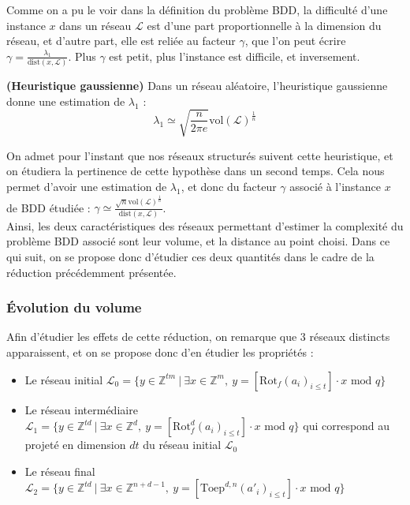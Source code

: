 \documentclass[11pt,a4paper]{article}
\begin{document}
Comme on a pu le voir dans la définition du problème BDD, la difficulté d'une instance $x$ dans un réseau $\mathcal{L}$ est d'une part proportionnelle à la dimension du réseau, et d'autre part, elle est reliée au facteur $\gamma$, que l'on peut écrire $\gamma = \frac{\lambda_1}{\text{dist}(x,\mathcal{L})}$. Plus $\gamma$ est petit, plus l'instance est difficile, et inversement. \\


\begin{rem}\textbf{(Heuristique gaussienne)}
Dans un réseau aléatoire, l'heuristique gaussienne donne une estimation de $\lambda_1$ :  \[\lambda_1 \simeq \sqrt{\frac{n}{2\pi e}}\text{vol}(\mathcal{L})^\frac{1}{n} \]
\end{rem}

On admet pour l'instant que nos réseaux structurés suivent cette heuristique, et on étudiera la pertinence de cette hypothèse dans un second temps. Cela nous permet d'avoir une estimation de $\lambda_1$, et donc du facteur $\gamma$ associé à l'instance $x$ de BDD étudiée : $\gamma \simeq \frac{\sqrt{n}\text{vol}(\mathcal{L})^\frac{1}{n}}{\text{dist}(x,\mathcal{L})}$. \\

Ainsi, les deux caractéristiques des réseaux permettant d'estimer la complexité du problème BDD associé sont leur volume, et la distance au point choisi.  Dans ce qui suit, on se propose donc d'étudier ces deux quantités dans le cadre de la réduction précédemment présentée.

\subsubsection{Évolution du volume }

Afin d'étudier les effets de cette réduction, on remarque que $3$ réseaux distincts apparaissent, et on se propose donc d'en étudier les propriétés : 
\begin{itemize}
\item Le réseau initial $\mathcal{L}_0 = \{ y \in \mathbb{Z}^{tm} \ | \ \exists x\in \mathbb{Z}^m,\ y=[\text{Rot}_f(a_i)_{i\leq t}]\cdot x \text{ mod }q \}$
\item Le réseau intermédiaire $\mathcal{L}_1 =\{ y \in \mathbb{Z}^{td} \ | \ \exists x\in \mathbb{Z}^d,\ y=[\text{Rot}_f^d(a_i)_{i\leq t}]\cdot x \text{ mod }q \}$  qui correspond au projeté en dimension $dt$ du réseau initial $\mathcal{L}_0$
\item Le réseau final $\mathcal{L}_2 = \{ y \in \mathbb{Z}^{td} \ | \ \exists x\in \mathbb{Z}^{n+d-1},\ y=[\text{Toep}^{d,n}(a'_i)_{i\leq t}]\cdot x \text{ mod }q\}$ \\
\end{itemize}
\end{document}
